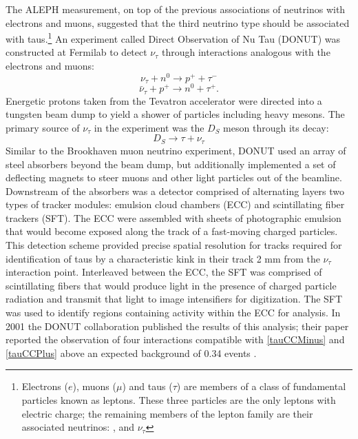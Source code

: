 The ALEPH measurement, on top of the previous associations of neutrinos with
electrons and muons, suggested that the third neutrino type should be
associated with taus.\footnote{Electrons ($e$), muons ($\mu$) and taus ($\tau$)
are members of a class of fundamental particles known as leptons.  These three
particles are the only leptons with electric charge; the remaining members of
the lepton family are their associated neutrinos: \nue, \numu and $\nu_\tau$  }
An experiment called Direct Observation of Nu Tau (DONUT) was constructed at
Fermilab to detect $\nu_\tau$ through interactions analogous with the electrons
and muons:
\begin{equation} \label{tauCCMinus}\nu_\tau + n^0 \rightarrow  p^+ + \tau^- \end{equation}
\begin{equation} \label{tauCCPlus}\bar{\nu}_\tau + p^+ \rightarrow n^0 + \tau^+ . \end{equation}
Energetic protons taken from the Tevatron accelerator were directed into a
tungsten beam dump to yield a shower of particles including heavy mesons.  The
primary source of $\nu_\tau$ in the experiment was the $D_S$ meson through its
decay:
\begin{equation}\label{nuTauDS}
D_S \rightarrow \tau + \nu_\tau
\end{equation}
Similar to the Brookhaven muon neutrino experiment, DONUT used an array of
steel absorbers beyond the beam dump, but additionally implemented a set of
deflecting magnets to steer muons and other light particles out of the
beamline.  Downstream of the absorbers was a detector comprised of alternating
layers two types of tracker modules: emulsion cloud chambers (ECC) and
scintillating fiber trackers (SFT).  The ECC were assembled with sheets of
photographic emulsion that would become exposed along the track of a
fast-moving charged particles.  This detection scheme provided precise spatial
resolution for tracks required for identification of taus by a characteristic
kink in their track 2 mm from the $\nu_\tau$ interaction point.  Interleaved
between the ECC, the SFT was comprised of scintillating fibers that would
produce light in the presence of charged particle radiation and transmit that
light to image intensifiers for digitization.  The SFT was used to identify
regions containing activity within the ECC for analysis.  In 2001 the DONUT
collaboration published the results of this analysis; their paper reported the
observation of four interactions compatible with \eqref{tauCCMinus} and
\eqref{tauCCPlus} above an expected background of 0.34 events  \cite{nuTau}.

